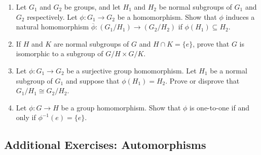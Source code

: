 {\begin{enumerate}
 
\bf\item\rm
Let $G_1$ and $G_2$ be groups, and let $H_1$ and $H_2$ be normal subgroups
of $G_1$ and $G_2$ respectively. Let $\phi : G_1 \rightarrow G_2$ be a
homomorphism. Show that $\phi$ induces a natural homomorphism
$\overline{\phi} : (G_1/H_1) \rightarrow (G_2/H_2)$ if $\phi(H_1) \subseteq
H_2$. 
 
 
\bf\item\rm
If $H$ and $K$ are normal subgroups of $G$ and $H \cap K = \{ e \}$,
prove that $G$ is isomorphic to a subgroup of $G/H \times G/K$.
 
 
 
\bf\item\rm
Let $\phi : G_1 \rightarrow G_2$ be a surjective group homomorphism.
Let $H_1$ be a normal subgroup of $G_1$ and suppose that $\phi(H_1) =
H_2$.  Prove or disprove that $G_1/H_1 \cong G_2/H_2$.
 
 
\bf\item\rm
Let $\phi : G \rightarrow H$ be a group homomorphism.  Show that
$\phi$ is one-to-one if and only if $\phi^{-1}(e) = \{ e \}$.


\end{enumerate}
}
 


\subsection*{Additional Exercises: Automorphisms}
 
